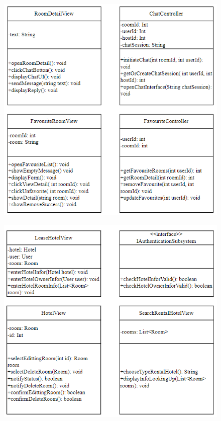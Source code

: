 \begin{figure}[H]
    \centering
    \includegraphics[width=\linewidth]{img3.6/7.png}
\end{figure}
\begin{figure}[H]
    \centering
    \includegraphics[width=\linewidth]{img3.6/8.png}
\end{figure}
